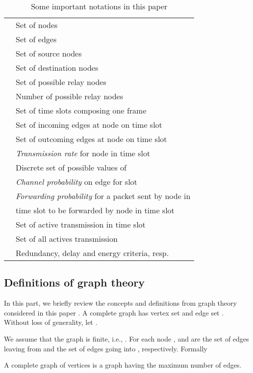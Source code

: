\documentclass[a4paper]{article}
\begin{document}
\begin{table} 
\caption{Some important notations in this paper} 
\centering
\label{tab:notations}
\begin{tabular}{| c | l |}
\hline
			& Set of nodes \\
		& Set of edges \\
		& Set of source nodes \\
		& Set of destination nodes\\
		& Set of possible relay nodes\\
				& Number of possible relay nodes\\
				& Set of time slots composing one frame\\
 		& Set of incoming edges at node   on time slot \\
 		& Set of outcoming edges at node  on time slot \\  
		& \emph{Transmission rate} for node  in time slot  \\
			& Discrete set of possible values of  \\			
 		& \emph{Channel probability} on edge  for slot  \\ 
		& \emph{Forwarding probability} for a packet sent by node  in \\
				&  time slot  to be forwarded by node  in time slot \\
			& Set of active transmission in time slot \\
				& Set of all actives transmission \\
		& Redundancy, delay and energy criteria, resp. \\
\hline

\end{tabular}
\end{table}

\subsection{Definitions of graph theory}

In this part, we briefly review the concepts and definitions from graph theory considered in this paper \cite{graph}. 
A complete graph  has vertex set  and edge set . Without loss of generality, let
.

We assume that the graph is finite, i.e., . 
For each node ,  and  are the set of edges leaving from and the set of edges going into , respectively. Formally 


A complete graph  of  vertices is a graph having the maximum number of edges. 
\end{document}
